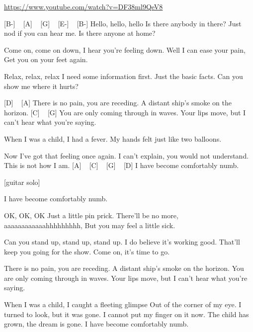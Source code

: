 
\url{https://www.youtube.com/watch?v=DF38ml9QeV8}

[B-] ~ [A] ~ [G] ~ [E-] ~ [B-]
Hello, hello, hello
Is there anybody in there?
Just nod if you can hear me.
Is there anyone at home?


Come on, come on down,
I hear you're feeling down.
Well I can ease your pain,
Get you on your feet again.

Relax, relax, relax
I need some information first.
Just the basic facts.
Can you show me where it hurts?

[D] ~ [A] 
There is no pain, you are receding.
A distant ship's smoke on the horizon.
[C] ~ [G] 
You are only coming through in waves.
Your lips move, but I can't hear what you're saying.

When I was a child, I had a fever.
My hands felt just like two balloons.

Now I've got that feeling once again.
I can't explain, you would not understand.
This is not how I am.
[A] ~ [C] ~ [G] ~ [D]
I have become comfortably numb.

[guitar solo]

I have become comfortably numb.

OK, OK, OK
Just a little pin prick.
There'll be no more, aaaaaaaaaaaahhhhhhhhh,
But you may feel a little sick.

Can you stand up, stand up, stand up.
I do believe it's working good.
That'll keep you going for the show.
Come on, it's time to go.

There is no pain, you are receding.
A distant ship's smoke on the horizon.
You are only coming through in waves.
Your lips move, but I can't hear what you're saying.

When I was a child, I caught a fleeting glimpse
Out of the corner of my eye.
I turned to look, but it was gone.
I cannot put my finger on it now.
The child has grown, the dream is gone.
I have become comfortably numb. 